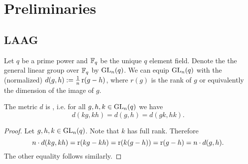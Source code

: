 








\section{Preliminaries}\label{sec:generalDefns}
\subsection*{LAAG}
Let $q$ be a prime power and $\mathbb{F}_q$ be the unique $q$ element field. Denote the the general linear group over $\mathbb{F}_q$ by $\operatorname{GL}_n(q)$. We can equip $\operatorname{GL}_n(q)$ with the (normalized)  $d(g,h):=\frac{1}{n}\operatorname{r}(g-h)$, where $r(g)$ is the rank of $g$ or equivalently the dimension of the image of $g$. 

\begin{lemma}
The metric $d$ is , i.e. for all $g,h,k\in \operatorname{GL}_n(q)$ we have 
\[d(kg,kh)=d(g,h)=d(gk,hk).\] 
\end{lemma}
\begin{proof}
Let $g,h,k\in \operatorname{GL}_n(q)$. Note that $k$ has full rank. Therefore
\[n\cdot d(kg,kh)=\operatorname{r}(kg-kh)=\operatorname{r}(k(g-h))=\operatorname{r}(g-h)=n\cdot d(g,h).\]
The other equality follows similarly.
\end{proof}


